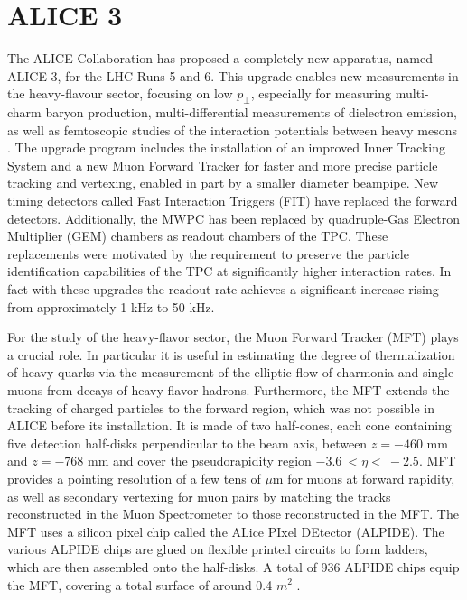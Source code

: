 \documentclass[12pt,a4paper]{book}
\begin{document}
	\section{ALICE 3}
	 The ALICE Collaboration has proposed a completely new apparatus, named ALICE 3, for the LHC Runs 5 and 6. This upgrade enables new measurements in the heavy-flavour sector, focusing on low $p_\perp$, especially for measuring multi-charm baryon production, multi-differential measurements of dielectron emission, as well as femtoscopic studies of the interaction potentials between heavy mesons \cite{Cheng:2908766}. The upgrade program includes the installation of an improved Inner Tracking System and a new Muon Forward Tracker for faster and more precise particle tracking and vertexing, enabled in part by a smaller diameter beampipe. New timing detectors called Fast Interaction Triggers (FIT) have replaced the forward detectors. Additionally, the MWPC has been replaced by quadruple-Gas Electron Multiplier (GEM) chambers as readout chambers of the TPC. These replacements were motivated by the requirement to preserve the particle identification capabilities of the TPC at significantly higher interaction rates. In fact with these upgrades the readout rate achieves a significant increase rising from approximately 1 kHz to 50 kHz. 
	
	For the study of the heavy-flavor sector, the Muon Forward Tracker (MFT) plays a crucial role. In particular it is useful in estimating the degree of thermalization of heavy quarks via the measurement of the elliptic flow of charmonia and single muons from decays of heavy-flavor hadrons. Furthermore, the MFT extends the tracking of charged particles to the forward region, which was not possible in ALICE before its installation. It is made of two half-cones, each cone containing five detection half-disks perpendicular to the beam axis, between $z = -460$ mm and $z = -768$ mm and cover the pseudorapidity region $-3.6 \ < \eta < \ -2.5$. MFT provides a pointing resolution of a few tens of $\mu$m for muons at forward rapidity, as well as secondary vertexing for muon pairs by matching the tracks reconstructed in the Muon Spectrometer to those reconstructed in the MFT. The MFT uses a silicon pixel chip called the ALice PIxel DEtector (ALPIDE). The various ALPIDE chips are glued on flexible printed circuits to form ladders, which are then assembled onto the half-disks. A total of 936 ALPIDE chips equip the MFT, covering a total surface of around 0.4 $m^2$ \cite{Herrmann:2920632}.
	
\end{document}
